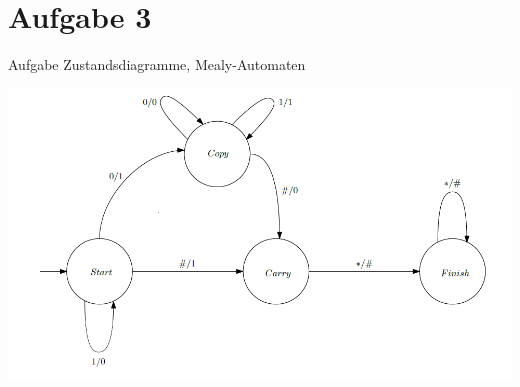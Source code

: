 
\section{Aufgabe 3}

\setcounter{exercise}{1}

%


    \begin{frame}{Aufgabe \thesection}{Zustandsdiagramme, Mealy-Automaten}
        \begin{solutionnoinc}
            \includegraphics[height=0.5\paperheight, center]{./figures/Mealy-Increment.png}
        \end{solutionnoinc}
    \end{frame}
